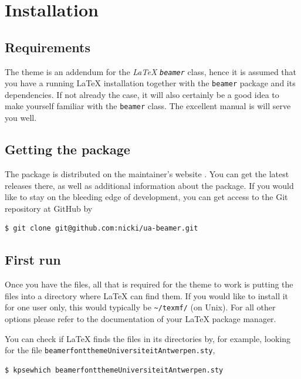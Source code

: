 \section{Installation}

\subsection{Requirements}
The theme is an addendum for the \emph{\LaTeX} \emph{\texttt{beamer}} class, hence it is assumed that you have a running \LaTeX{} installation together with the \texttt{beamer} package \cite{Miletic:2010:LBC} and its dependencies. If not already the case, it will also certainly be a good idea to make yourself familiar with the \texttt{beamer} class. The excellent manual \cite{TWM:2010:BCU} is will serve you well.

\subsection{Getting the package}

The package is distributed on the maintainer's website \cite{Schloemer:2011:website}. You can get the latest releases there, as well as additional information about the package. If you would like to stay on the bleeding edge of development, you can get access to the Git  repository at GitHub \cite{GitHub:2011:uabeamer} by
\begin{lstlisting}
$ git clone git@github.com:nicki/ua-beamer.git
\end{lstlisting}


\subsection{First run}
Once you have the files, all that is required for the theme to work is putting the files into a directory where \LaTeX{} can find them. If you would like to install it for one user only, this would typically be \lstinline{~/texmf/} (on Unix). For all other options please refer to the documentation of your \LaTeX{} package manager.

You can check if \LaTeX{} finds the files in its directories by, for example, looking for the file \lstinline!beamerfontthemeUniversiteitAntwerpen.sty!,
\begin{lstlisting}
$ kpsewhich beamerfontthemeUniversiteitAntwerpen.sty
\end{lstlisting}

